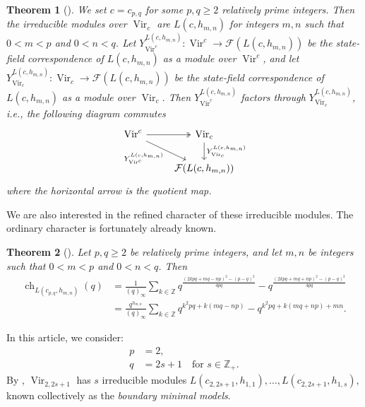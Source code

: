 \documentclass[a4paper, 12pt, reqno]{amsart}
\newtheorem{theorem}{Theorem}[section]
\theoremstyle{remark}
\DeclareMathOperator{\Vir}{Vir}
\DeclareMathOperator{\ch}{ch}
\begin{document}
\begin{theorem}[{\cite{wang_rationality_1993}}]
  \label{thr:9}
  We set $c = c_{p, q}$ for some $p, q \ge 2$ relatively prime integers.
  Then the irreducible modules over $\Vir_c$ are $L(c, h_{m, n})$ for integers $m, n$ such that $0 < m < p$ and $0 < n < q$.
  Let $Y^{L(c, h_{m, n})}_{\Vir^c}: \Vir^c \to \mathcal{F}(L(c, h_{m, n}))$ be the state-field correspondence of $L(c, h_{m, n})$ as a module over $\Vir^c$, and let $Y^{L(c, h_{m, n})}_{\Vir_c}: \Vir_c \to \mathcal{F}(L(c, h_{m, n}))$ be the state-field correspondence of $L(c, h_{m, n})$ as a module over $\Vir_c$.
  Then $Y^{L(c, h_{m, n})}_{\Vir^c}$ factors through $Y^{L(c, h_{m, n})}_{\Vir_c}$, i.e., the following diagram commutes
  \begin{equation*}
    \begin{tikzcd}
      \Vir^c \arrow[r, two heads] \arrow[rd, "{Y^{L(c, h_{m, n})}_{\Vir^c}}"'] & {\Vir_c} \arrow[d, "{Y^{L(c, h_{m, n})}_{\Vir_c}}"] \\
      & {\mathcal{F}(L(c, h_{m, n}))}
    \end{tikzcd}
  \end{equation*}
  where the horizontal arrow is the quotient map.
\end{theorem}

We are also interested in the refined character of these irreducible modules.
The ordinary character is fortunately already known.

\begin{theorem}[{\cite{feigin_verma_1984}}]
  \label{thr:10}
  Let $p, q \ge 2$ be relatively prime integers, and let $m, n$ be integers such that $0 < m < p$ and $0 < n < q$.
  Then
  \begin{align*}
    \ch_{L(c_{p, q}, h_{m, n})}(q) &= \frac{1}{(q)_{\infty}}\sum_{k \in \mathbb{Z}}q^{\frac{(2kpq + mq - np)^2 - (p - q)^2}{4pq}} - q^{\frac{(2kpq + mq + np)^2 - (p - q)^2}{4pq}} \\
                                   &= \frac{q^{h_{m, n}}}{(q)_{\infty}}\sum_{k \in \mathbb{Z}}q^{k^2pq + k(mq - np)} - q^{k^2pq + k(mq + np) + mn}.
  \end{align*}
\end{theorem}

In this article, we consider:
\begin{align*}
  p &= 2, \\
  q &= 2s + 1 \quad \text{for $s \in \mathbb{Z}_+$}.
\end{align*}
By , $\Vir_{2, 2s + 1}$ has $s$ irreducible modules $L(c_{2, 2s + 1}, h_{1, 1}), \dots, L(c_{2, 2s + 1}, h_{1, s})$, known collectively as the \emph{boundary minimal models}.
\end{document}
